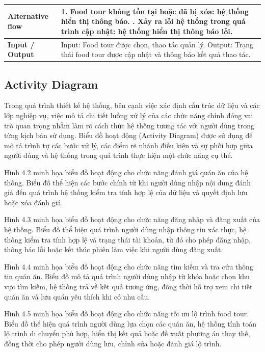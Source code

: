 \begin{longtable}{|p{4cm}|p{10cm}|}
\textbf{Alternative flow} &
1. Food tour không tồn tại hoặc đã bị xóa: hệ thống hiển thị thông báo. \newline 2. Xảy ra lỗi hệ thống trong quá trình cập nhật: hệ thống hiển thị thông báo lỗi. \\
\hline

\textbf{Input / Output} &
Input: Food tour được chọn, thao tác quản lý. \newline Output: Trạng thái food tour được cập nhật và thông báo kết quả thao tác. \\
\hline

\end{longtable}
\endgroup


\subsection{Activity Diagram }

Trong quá trình thiết kế hệ thống, bên cạnh việc xác định cấu trúc dữ liệu và các lớp nghiệp vụ, việc mô tả chi tiết luồng xử lý của các chức năng chính đóng vai trò quan trọng nhằm làm rõ cách thức hệ thống tương tác với người dùng trong từng kịch bản sử dụng. Biểu đồ hoạt động (Activity Diagram) được sử dụng để mô tả trình tự các bước xử lý, các điểm rẽ nhánh điều kiện và sự phối hợp giữa người dùng và hệ thống trong quá trình thực hiện một chức năng cụ thể.


Hình 4.2 minh họa biểu đồ hoạt động cho chức năng đánh giá quán ăn của hệ thống. Biểu đồ thể hiện các bước chính từ khi người dùng nhập nội dung đánh giá đến quá trình hệ thống kiểm tra tính hợp lệ của dữ liệu và quyết định lưu hoặc xóa đánh giá.

Hình 4.3 minh họa biểu đồ hoạt động cho chức năng đăng nhập và đăng xuất của hệ thống. Biểu đồ thể hiện quá trình người dùng nhập thông tin xác thực, hệ thống kiểm tra tính hợp lệ và trạng thái tài khoản, từ đó cho phép đăng nhập, thông báo lỗi hoặc kết thúc phiên làm việc khi người dùng đăng xuất.

Hình 4.4 minh họa biểu đồ hoạt động cho chức năng tìm kiếm và tra cứu thông tin quán ăn. Biểu đồ mô tả quá trình người dùng nhập từ khóa hoặc chọn khu vực tìm kiếm, hệ thống trả về kết quả tương ứng, đồng thời hỗ trợ xem chi tiết quán ăn và lưu quán yêu thích khi có nhu cầu.

Hình 4.5 minh họa biểu đồ hoạt động cho chức năng tối ưu lộ trình food tour. Biểu đồ thể hiện quá trình người dùng lựa chọn các quán ăn, hệ thống tính toán lộ trình di chuyển phù hợp, hiển thị kết quả hoặc đề xuất phương án thay thế, đồng thời cho phép người dùng lưu, chỉnh sửa hoặc đánh giá lộ trình.

